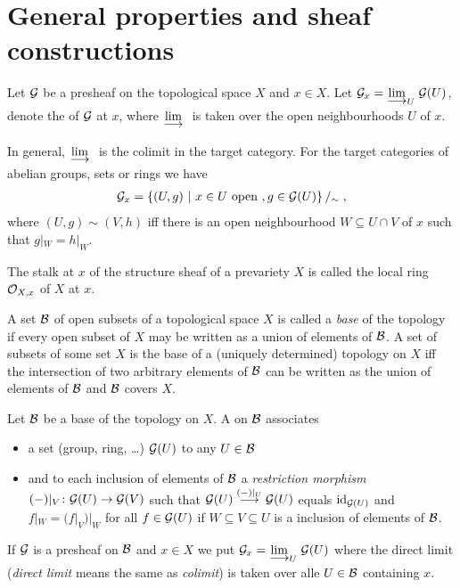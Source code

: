 \documentclass[a4paper,parskip=half,numbers=enddot, DIV=12]{scrreprt}
\begin{document}
\section{General properties and sheaf constructions}
\begin{defi}[Stalk]
    Let $\mathcal{G}$ be a presheaf on the topological space $X$ and $x\in X$. Let $\Gg_x = \colimit[U] \Gg(U)$, denote the  of $\mathcal{G}$ at $x$, where $\colimit$ is taken over the open neighbourhoods $U$ of $x$.
\end{defi}
\begin{rem*}
    In general, $\colimit$ is the colimit in the target category. For the target categories of abelian groups, sets or rings we have
    \begin{align*}
        \mathcal{G}_x = \left\{(U,g) \ \middle|\  x\in U \text{ open }, g\in \mathcal{G}(U)\right\}/_\sim\;,
    \end{align*}
    where $(U,g)\sim (V,h)$ iff there is an open neighbourhood $W\subseteq U\cap V$ of $x$ such that $g|_W = h|_W$. 
\end{rem*}
\begin{example}
    The stalk at $x$ of the structure sheaf of a prevariety $X$ is called the local ring $\mathcal{O}_{X,x}$ of $X$ at $x$.
\end{example}
\begin{rem*}
    A set $\mathcal{B}$ of open subsets of a topological space $X$ is called a \emph{base} of the topology if every open subset of $X$ may be written as a union of elements of $\mathcal{B}$. A set of subsets of some set $X$ is the base of a (uniquely determined) topology on $X$ iff the intersection of two arbitrary elements of $\mathcal{B}$ can be written as the union of elements of $\mathcal{B}$ and $\mathcal{B}$ covers $X$.
\end{rem*}
\begin{defi}
    Let $\mathcal{B}$ be a base of the topology on $X$. A  on $\mathcal{B}$ associates
    \begin{itemize}
    	\item a set (group, ring, \ldots) $\mathcal{G}(U)$ to any $U\in \mathcal{B}$
    	\item and to each inclusion of elements of $\mathcal{B}$ a \emph{restriction morphism}  		$(-)|_V\colon\Gg(U) \morphism \Gg(V)$
    	such that $\Gg(U) \morphism[(-)|_U]\Gg(U)$ equals $\operatorname{id}_{\mathcal{G}(U)}$ and $f|_W = (f|_V)|_W$ for all $f\in \mathcal{G}(U)$ if $W\subseteq V\subseteq U$ is a inclusion of elements of $\mathcal{B}$. 
    \end{itemize}
	 If $\mathcal{G}$ is a presheaf on $\mathcal{B}$ and $x\in X$ we put $\Gg_x = \colimit[U] \Gg(U)$ where the direct limit (\emph{direct limit} means the same as \emph{colimit}) is taken over alle $U\in \mathcal{B}$ containing $x$.
\end{defi}
\end{document}
